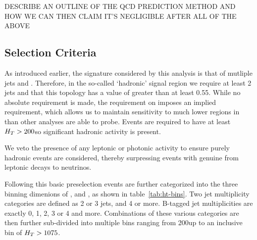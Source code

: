 DESCRIBE AN OUTLINE OF THE QCD PREDICTION METHOD AND HOW WE CAN THEN CLAIM IT'S 
NEGLIGIBLE AFTER ALL OF THE ABOVE

\subsection{Selection Criteria}
\label{sec:selec_crit}
As introduced earlier, the signature considered by this analysis is that of 
mutliple jets and \met. Therefore, in the so-called `hadronic' signal region we 
require at least 2 jets and that this topology has a value of \alphat greater than
at least 0.55. While no absolute \met requirement is made, the requirement on 
\alphat imposes an implied requirement, which allows us to maintain 
sensitivity to much lower regions in \met than other analyses are able to 
probe. Events are required to have at least $H_T > 200$\gev so significant
hadronic activity is present.

We veto the presence of any leptonic or 
photonic activity to ensure purely hadronic events are considered, thereby 
surpressing events with genuine \met from leptonic decays to neutrinos.

Following this basic preselection events are further categorized into the three 
binning dimenions of \HT, \nb and \nj, as shown in table~\ref{tab:ht-bins}. Two 
jet multiplicity categories are defined as 2 or 3 jets, and 4 or more. B-tagged 
jet multiplicities are exactly 0, 1, 2, 3 or 4 and more. Combinations of these 
various categories are then further sub-divided into multiple \HT bins ranging 
from 200\gev up to an inclusive bin of $H_T>1075$\gev.

